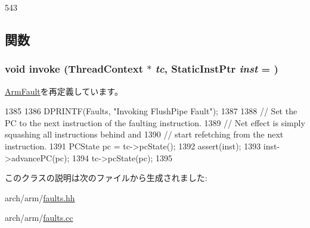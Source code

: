 \begin{DoxyCode}
543 {}
\end{DoxyCode}


\subsection{関数}
\hypertarget{classArmISA_1_1FlushPipe_a2bd783b42262278d41157d428e1f8d6f}{
\subsubsection[{invoke}]{\setlength{\rightskip}{0pt plus 5cm}void invoke ({\bf ThreadContext} $\ast$ {\em tc}, \/  {\bf StaticInstPtr} {\em inst} = {})}}
\label{classArmISA_1_1FlushPipe_a2bd783b42262278d41157d428e1f8d6f}


\hyperlink{classArmISA_1_1ArmFault_a2bd783b42262278d41157d428e1f8d6f}{ArmFault}を再定義しています。


\begin{DoxyCode}
1385                                                        {
1386     DPRINTF(Faults, "Invoking FlushPipe Fault\n");
1387 
1388     // Set the PC to the next instruction of the faulting instruction.
1389     // Net effect is simply squashing all instructions behind and
1390     // start refetching from the next instruction.
1391     PCState pc = tc->pcState();
1392     assert(inst);
1393     inst->advancePC(pc);
1394     tc->pcState(pc);
1395 }
\end{DoxyCode}


このクラスの説明は次のファイルから生成されました:\begin{DoxyCompactItemize}
\item 
arch/arm/\hyperlink{arch_2arm_2faults_8hh}{faults.hh}\item 
arch/arm/\hyperlink{arch_2arm_2faults_8cc}{faults.cc}\end{DoxyCompactItemize}
